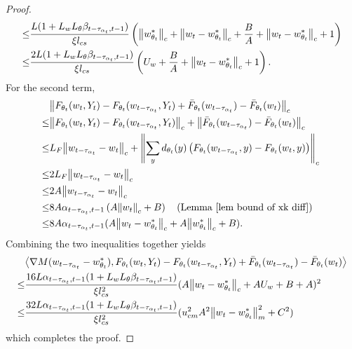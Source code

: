\documentclass[twoside,11pt]{article}
\newcommand{\indot}[2]{{\left<#1, #2\right>}}
\numberwithin{assucounter}{section}
\begin{document}
\begin{proof}
\begin{align}
  \leq& \frac{L (1 + L_wL_\theta \beta_{t-\tau_{\alpha_t}, t-1})}{\xi l_{cs}}\left(\norm{w^*_{\theta_t}}_c + \norm{w_t - w^*_{\theta_t}}_c + \frac{B}{A} + \norm{w_t - w^*_{\theta_t}}_c + 1\right) \\
  \leq& \frac{2L (1 + L_wL_\theta \beta_{t-\tau_{\alpha_t}, t-1})}{\xi l_{cs}}\left(U_w + \frac{B}{A} + \norm{w_t - w^*_{\theta_t}}_c + 1\right).
\end{align}
For the second term,
\begin{align}
  &\norm{F_{\theta_t}(w_t, Y_t) - F_{\theta_t}(w_{t- \tau_{\alpha_t}}, Y_t) + \bar F_{\theta_t}(w_{t- \tau_{\alpha_t}}) - \bar F_{\theta_t}(w_t)}_c \\
  \leq &\norm{F_{\theta_t}(w_t, Y_t) - F_{\theta_t}(w_{t- \tau_{\alpha_t}}, Y_t)}_c + \norm{\bar F_{\theta_t}(w_{t- \tau_{\alpha_t}}) - \bar F_{\theta_t}(w_t)}_c \\
  \leq& L_F \norm{w_{t-\tau_{\alpha_t}} - w_t}_c + \norm{\sum_{y} d_{\theta_t}(y) \left(F_{\theta_t}(w_{t-\tau_{\alpha_t}}, y) - F_{\theta_t}(w_t, y)\right)}_c \\
  \leq& 2L_F \norm{w_{t-\tau_{\alpha_t}} - w_t}_c \\
  \leq& 2A \norm{w_{t-\tau_{\alpha_t}} - w_t}_c \\
  \leq& 8A \alpha_{t-\tau_{\alpha_t}, t-1} \left(A \norm{w_t}_c + B\right) \qq{(Lemma~\ref{lem bound of xk diff})} \\
  \leq& 8A \alpha_{t-\tau_{\alpha_t}, t-1} (A\norm{w_t - w^*_{\theta_t}}_c + A \norm{w^*_{\theta_t}}_c + B).
\end{align}
Combining the two inequalities together yields
\begin{align}
  &\indot{\nabla M(w_{t-\tau_{\alpha_t}} - w^*_{\theta_t})}{F_{\theta_t}(w_t, Y_t) - F_{\theta_t}(w_{t- \tau_{\alpha_t}}, Y_t) + \bar F_{\theta_t}(w_{t- \tau_{\alpha_t}}) - \bar F_{\theta_t}(w_t)} \\
  \leq&\frac{16L  \alpha_{t-\tau_{\alpha_t}, t-1}(1 + L_wL_\theta \beta_{t-\tau_{\alpha_t}, t-1})}{\xi l_{cs}^2}(A\norm{w_t - w^*_{\theta_t}}_c + A U_w + B + A)^2 \\
  \leq&\frac{32L  \alpha_{t-\tau_{\alpha_t}, t-1}(1 + L_wL_\theta \beta_{t-\tau_{\alpha_t}, t-1})}{\xi l_{cs}^2}(u_{cm}^2A^2 \norm{w_t - w^*_{\theta_t}}_m^2 + C^2) 
\end{align}
which completes the proof.
\end{proof}
\end{document}
